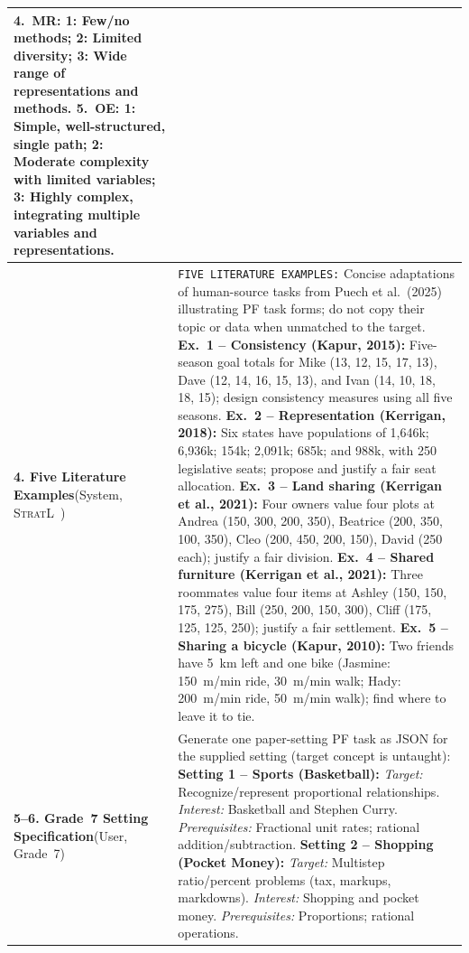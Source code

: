 {\begin{table}[!htbp]
{\begin{tabular}{@{} >{\raggedright\arraybackslash}p{} >{\raggedright\arraybackslash}p{} @{}}
\textbf{4.~MR:} 1: Few/no methods; 2: Limited diversity; 3: Wide range of representations and methods.\newline
\textbf{5.~OE:} 1: Simple, well-structured, single path; 2: Moderate complexity with limited variables; 3: Highly complex, integrating multiple variables and representations. \\
\midrule
\textbf{4. Five Literature Examples}\newline (System, \textsc{StratL}~\cite{puech2025}) &
\texttt{FIVE LITERATURE EXAMPLES:} Concise adaptations of human-source tasks from Puech et al.\ (2025) illustrating PF task forms; do not copy their topic or data when unmatched to the target.\newline
\textbf{Ex.~1 -- Consistency (Kapur, 2015):} Five-season goal totals for Mike (13, 12, 15, 17, 13), Dave (12, 14, 16, 15, 13), and Ivan (14, 10, 18, 18, 15); design consistency measures using all five seasons.\newline
\textbf{Ex.~2 -- Representation (Kerrigan, 2018):} Six states have populations of 1,646k; 6,936k; 154k; 2,091k; 685k; and 988k, with 250 legislative seats; propose and justify a fair seat allocation.\newline
\textbf{Ex.~3 -- Land sharing (Kerrigan et al., 2021):} Four owners value four plots at Andrea (150, 300, 200, 350), Beatrice (200, 350, 100, 350), Cleo (200, 450, 200, 150), David (250 each); justify a fair division.\newline
\textbf{Ex.~4 -- Shared furniture (Kerrigan et al., 2021):} Three roommates value four items at Ashley (150, 150, 175, 275), Bill (250, 200, 150, 300), Cliff (175, 125, 125, 250); justify a fair settlement.\newline
\textbf{Ex.~5 -- Sharing a bicycle (Kapur, 2010):} Two friends have 5~km left and one bike (Jasmine: 150~m/min ride, 30~m/min walk; Hady: 200~m/min ride, 50~m/min walk); find where to leave it to tie. \\
\midrule
\textbf{5--6. Grade~7 Setting Specification}\newline (User, Grade~7) &
Generate one paper-setting PF task as JSON for the supplied setting (target concept is untaught):\newline
\textbf{Setting 1 -- Sports (Basketball):} \emph{Target:} Recognize/represent proportional relationships. \emph{Interest:} Basketball and Stephen Curry. \emph{Prerequisites:} Fractional unit rates; rational addition/subtraction.\newline
\textbf{Setting 2 -- Shopping (Pocket Money):} \emph{Target:} Multistep ratio/percent problems (tax, markups, markdowns). \emph{Interest:} Shopping and pocket money. \emph{Prerequisites:} Proportions; rational operations.\newline

\end{tabular}}
\end{table}}
